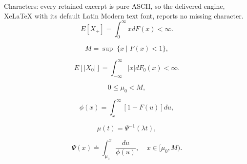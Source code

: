 \documentclass[10pt,a4paper]{amsart}
\begin{document}
Characters: every retained excerpt is pure ASCII, so the delivered engine, XeLaTeX with its default Latin Modern text font, reports no missing character.
	\begin{equation}\label{fm}
		E[X_+]=\int_{0}^\infty xdF(x)<\infty.\end{equation}

	\begin{equation}\label{def_M}M=\sup\; \{ x\;|\; F(x)<1\},\end{equation}

	\begin{equation}\label{fm0} E[|X_0|]=\int_{-\infty}^\infty |x|dF_0(x)<\infty.
	\end{equation}

	\begin{equation}\label{mM}0\leq \mu_0<M,\end{equation}

\begin{equation} \label{defphi}\phi(x)=\int_x^\infty [1-F(u)]du,
\end{equation}

	\begin{equation}\label{ef}\mu(t)=\Psi^{-1}(\lambda t),\end{equation}

	\begin{equation}\label{def_Psi}\Psi(x)\doteq\int_{\mu_0}^x \frac{du}{\phi(u)},\;\;\;\; x\in [\mu_0,M).\end{equation}
\end{document}
